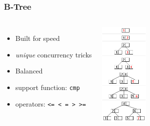 \documentclass{beamer}
\begin{document}
\begin{frame}[fragile]
  \frametitle{B-Tree}

  \vfill

\begin{columns}[c]

  \begin{itemize}
  \item Built for speed
  \item \textit{unique} concurrency tricks
  \item Balanced
  \item support function: \texttt{cmp}
  \item operators: \texttt{<= < = > >=}
  \end{itemize}

\begin{center}
  \includegraphics[height=14em]{B_tree_insertion_example.png}
\end{center}
\end{columns}
\end{frame}
\end{document}
